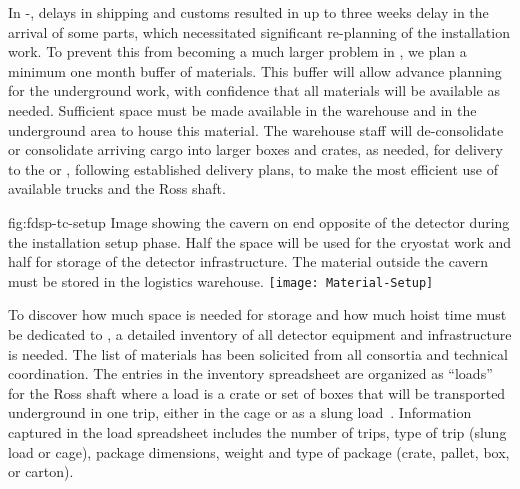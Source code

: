 In -, delays in shipping and customs resulted in up to three weeks delay in the arrival of some parts, which necessitated significant re-planning of the installation work. To prevent this from becoming a much larger problem in , we plan a minimum one month buffer of materials. This buffer will allow advance planning for the underground work, %
with confidence that all materials will be available as needed. %
Sufficient space must be made available in the warehouse and in the underground area  to house this material. %
The warehouse staff will de-consolidate or consolidate arriving cargo into larger boxes and crates, as needed, for  delivery to the  or , following established %
delivery plans, to make the most efficient use of available trucks and the Ross shaft. %


\begin{dunefigure}{fig:fdsp-tc-setup}
  {Image showing the cavern on end opposite of the detector during the installation setup phase.  Half the space will be used for the cryostat work and half for storage of the detector infrastructure. The material outside the cavern must be stored in the logistics warehouse.}
\texttt{[image: Material-Setup]}
\end{dunefigure}
%

To discover how much space is needed for storage and how much hoist time must be dedicated to , a detailed inventory of all detector equipment and  infrastructure is needed. The list of %
materials has been solicited from all consortia and technical coordination. The entries in the inventory spreadsheet are organized as ``loads'' for the Ross shaft where a load is a crate or set of boxes that will be transported underground in one trip, either in the %
cage or as a slung load~\cite{bib:docdb8426}. 
Information captured in the load spreadsheet includes the number of %
trips, type of trip (slung load or cage), package dimensions, weight and type of package (crate, pallet, box, or carton). 


